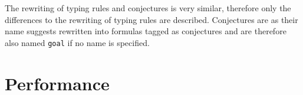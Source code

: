 The rewriting of typing rules and conjectures is very similar,
therefore only the differences to the rewriting of typing rules are
described. Conjectures are as their name suggests rewritten into
formulas tagged as conjectures and are therefore also named
\texttt{goal} if no name is specified. 

\section{Performance}
